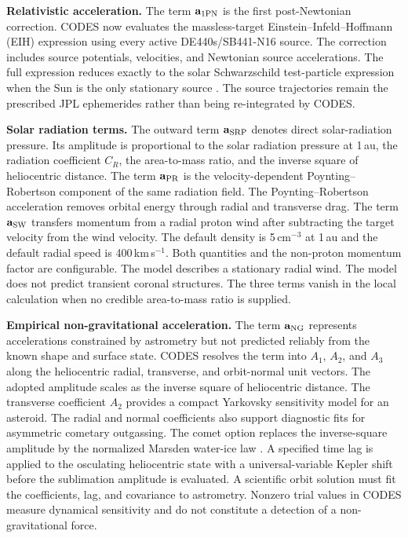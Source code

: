 \textbf{Relativistic acceleration.}
The term $\mathbf a_{\rm 1PN}$ is the first post-Newtonian correction. CODES
now evaluates the massless-target Einstein--Infeld--Hoffmann (EIH) expression
using every active DE440s/SB441-N16 source. The correction includes source
potentials, velocities, and Newtonian source accelerations. The full
expression reduces exactly to the solar Schwarzschild test-particle
expression when the Sun is the only stationary source
\cite{Newhall1983,Tamayo2020}. The source trajectories remain the prescribed
JPL ephemerides rather than being re-integrated by CODES.

\textbf{Solar radiation terms.}
The outward term $\mathbf a_{\rm SRP}$ denotes direct solar-radiation
pressure. Its amplitude is proportional to the solar radiation pressure at
1\,au, the radiation coefficient $C_R$, the area-to-mass ratio, and the
inverse square of heliocentric distance. The term $\mathbf a_{\rm PR}$ is the
velocity-dependent Poynting--Robertson component of the same radiation field.
The Poynting--Robertson acceleration removes orbital energy through radial
and transverse drag. The term $\mathbf a_{\rm SW}$ transfers momentum from a
radial proton wind after subtracting the target velocity from the wind
velocity. The default density is 5\,cm$^{-3}$ at 1\,au and the default radial
speed is 400\,km\,s$^{-1}$. Both quantities and the non-proton momentum factor
are configurable. The model describes a stationary radial wind. The model does not
predict transient coronal structures. The three terms vanish in the local
calculation when no credible area-to-mass ratio is supplied.

\textbf{Empirical non-gravitational acceleration.}
The term $\mathbf a_{\rm NG}$ represents accelerations constrained by
astrometry but not predicted reliably from the known shape and surface state.
CODES resolves the term into $A_1$, $A_2$, and $A_3$ along the
heliocentric radial, transverse, and orbit-normal unit vectors. The adopted
amplitude scales as the inverse square of heliocentric distance. The
transverse coefficient $A_2$ provides a compact Yarkovsky sensitivity model
for an asteroid. The radial and normal coefficients also support diagnostic
fits for asymmetric cometary outgassing. The comet option replaces the
inverse-square amplitude by the normalized Marsden water-ice law
\cite{Marsden1973}. A specified time lag is applied to the osculating
heliocentric state with a
universal-variable Kepler shift before the sublimation amplitude is
evaluated. A scientific orbit solution must fit the coefficients, lag, and
covariance to astrometry. Nonzero trial values in CODES measure dynamical
sensitivity and do not constitute a detection of a non-gravitational force.

